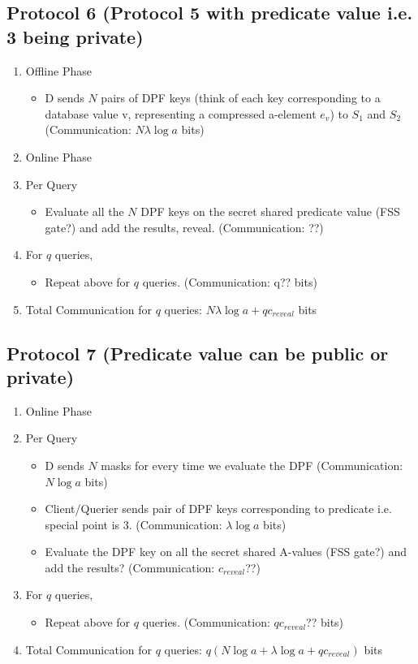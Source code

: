 \subsection{Protocol 6 (Protocol 5 with predicate value i.e. 3 being private)}
\begin{enumerate}
    \item Offline Phase
    \begin{itemize}
        \item D sends $N$ pairs of DPF keys (think of each key corresponding to a database value v, representing a compressed a-element $e_v$) to $S_1$ and $S_2$ (Communication: $N\lambda\log a$ bits)
    \end{itemize}
    \item Online Phase
    \item Per Query
    \begin{itemize}
        \item Evaluate all the $N$ DPF keys on the secret shared predicate value (FSS gate?) and add the results, reveal. (Communication: ??)
    \end{itemize}
    \item For $q$ queries,
    \begin{itemize}
        \item Repeat above for $q$ queries. (Communication: q?? bits)
    \end{itemize}
    \item Total Communication for $q$ queries: $N\lambda\log a + qc_{reveal}$ bits  
\end{enumerate}

\subsection{Protocol 7 (Predicate value can be public or private)}
\begin{enumerate}
    \item Online Phase
    \item Per Query
    \begin{itemize}
        \item D sends $N$ masks for every time we evaluate the DPF (Communication: $N\log a$ bits)
        \item Client/Querier sends pair of DPF keys corresponding to predicate i.e. special point is 3. (Communication: $\lambda\log a$ bits) 
        \item Evaluate the DPF key on all the secret shared A-values (FSS gate?) and add the results? (Communication: $c_{reveal}$??)
    \end{itemize}
    \item For $q$ queries,
    \begin{itemize}
        \item Repeat above for $q$ queries. (Communication: $qc_{reveal}$?? bits)
    \end{itemize}
    \item Total Communication for $q$ queries: $q(N\log a + \lambda \log a + qc_{reveal})$ bits  
\end{enumerate}

